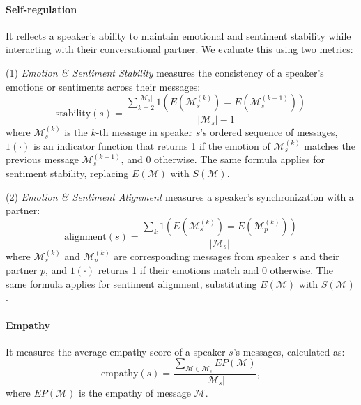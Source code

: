 \paragraph{Self-regulation}
It reflects a speaker’s ability to maintain emotional and sentiment stability while interacting with their conversational partner.
We evaluate this using two metrics:

\vspace{0.2cm}\noindent
(1) \textit{Emotion \& Sentiment Stability} measures the consistency of a speaker's emotions or sentiments across their messages:
\[
\text{stability}(s) = \frac{\sum_{k=2}^{|\mathcal{M}_s|} 1(E(\mathcal{M}_s^{(k)}) = E(\mathcal{M}_s^{(k-1)}))}{|\mathcal{M}_s| - 1}
\]  
where \( \mathcal{M}_s^{(k)} \) is the \( k \)-th message in speaker \( s \)'s ordered sequence of messages, \( 1(\cdot) \) is an indicator function that returns 1 if the emotion of \( \mathcal{M}_s^{(k)} \) matches the previous message \( \mathcal{M}_s^{(k-1)} \), and 0 otherwise.
The same formula applies for sentiment stability, replacing \( E(\mathcal{M}) \) with \( S(\mathcal{M}) \).  

\vspace{0.2cm}\noindent
(2) \textit{Emotion \& Sentiment Alignment} measures a speaker's synchronization with a partner:  
\[
\text{alignment}(s) = \frac{\sum_{k} 1(E(\mathcal{M}_s^{(k)}) = E(\mathcal{M}_p^{(k)}))}{|\mathcal{M}_s|}
\]  
where \( \mathcal{M}_s^{(k)} \) and \( \mathcal{M}_p^{(k)} \) are corresponding messages from speaker \( s \) and their partner \( p \), and \( 1(\cdot) \) returns 1 if their emotions match and 0 otherwise.  
The same formula applies for sentiment alignment, substituting \( E(\mathcal{M}) \) with \( S(\mathcal{M}) \).  








\paragraph{Empathy}  
It measures the average empathy score of a speaker \(s\)’s messages, calculated as:  
\[
\text{empathy}(s) = \frac{\sum_{\mathcal{M} \in \mathcal{M}_s} EP(\mathcal{M})}{|\mathcal{M}_s|},
\]  
where \(EP(\mathcal{M})\) is the empathy of message \(\mathcal{M}\).






